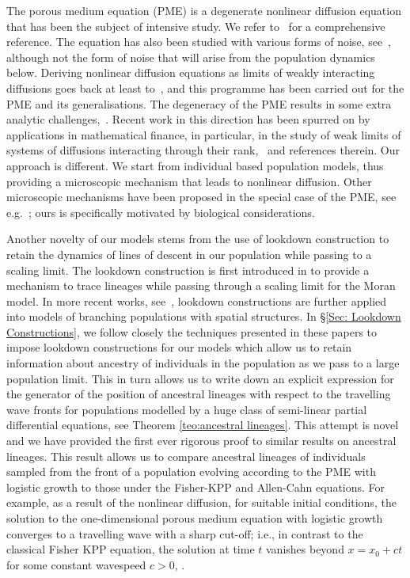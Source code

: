 \documentclass[12pt]{article}
\begin{document}
The porous medium equation (PME)
is a degenerate nonlinear diffusion equation that
has been the subject of intensive study. We refer to~\cite{vazquez:2007} for 
a comprehensive reference. The equation has also been studied with various
forms of noise, see~\cite{barbu/daprato/roeckner:2016}, although not the 
form of noise that will arise from the population dynamics below. 
Deriving nonlinear diffusion equations as limits of weakly interacting 
diffusions goes back at least to~\cite{mckean:1967}, and this 
programme has been
carried out for the PME and its generalisations. 
The degeneracy of the PME
results in some extra analytic
challenges,~\cite{jourdain:2000}.
Recent work in this 
direction has been spurred on by applications
in mathematical finance, %
in particular, in the study of weak limits of systems
of diffusions interacting through their 
rank,~\cite{dembo/shkolnikov/varadhan/zeitouni:2016, jourdain/reygner:2013}
and references therein.
Our approach is different.
We start from individual
based population models, thus providing a microscopic mechanism that leads to 
nonlinear diffusion.
Other microscopic mechanisms have been proposed in the special case of the
PME, see 
e.g.~\cite{feng/iscoe/seppalainen:1997, oelschlaeger:1990}; ours
is specifically motivated by biological considerations.




Another novelty of our models stems from the use of lookdown construction to retain the dynamics of lines of descent in our population while passing to a scaling limit. The lookdown construction is first introduced in \cite{donnelly/kurtz:1996} to provide a mechanism to trace lineages while passing through a scaling limit for the Moran model. In more recent works, see~\cite{kurtz/rodrigues:2011, etheridge/kurtz:2018}, lookdown constructions are further applied into models of branching populations with spatial structures. In \S \ref{Sec: Lookdown Constructions}, we follow closely the techniques presented in these papers to impose lookdown constructions for our models which allow us to retain information about ancestry of individuals in the population as we pass to a large population limit. This in turn allows us to write down an explicit expression for the generator of the position of ancestral lineages with respect to the travelling wave fronts for populations modelled by a huge class of semi-linear partial differential equations, see Theorem \ref{teo:ancestral lineages}.
This attempt is novel and we have provided the first ever rigorous proof to similar results on ancestral lineages. This result allows us to compare ancestral lineages of individuals sampled from the front of a population evolving according to the PME with logistic growth to those under the Fisher-KPP and Allen-Cahn equations. For example, as a result of the nonlinear diffusion, 
for suitable initial conditions, the solution to the one-dimensional 
porous medium equation with logistic growth converges to a travelling
wave with a sharp cut-off; i.e., in contrast to the classical 
Fisher KPP equation, the solution at time $t$
vanishes beyond $x=x_0+ct$ for some constant wavespeed
$c>0$, \cite{kamin/rosenau:2004}.
\end{document}
